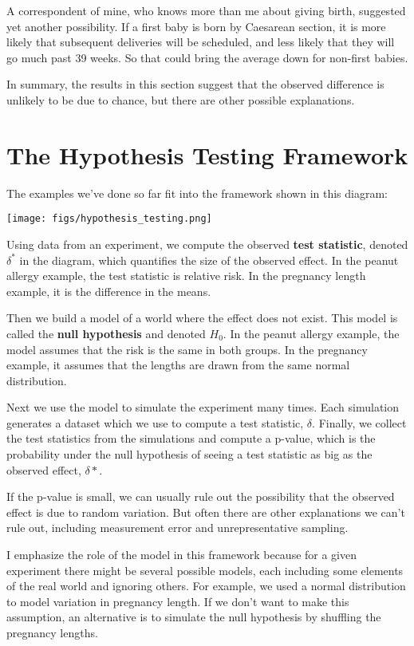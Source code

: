 A correspondent of mine, who knows more than me about giving birth,
suggested yet another possibility. If a first baby is born by Caesarean
section, it is more likely that subsequent deliveries will be scheduled,
and less likely that they will go much past 39 weeks. So that could
bring the average down for non-first babies.

In summary, the results in this section suggest that the observed
difference is unlikely to be due to chance, but there are other possible
explanations.

\section{The Hypothesis Testing
Framework}\label{the-hypothesis-testing-framework}

The examples we've done so far fit into the framework shown in this
diagram:

\texttt{[image: figs/hypothesis\_testing.png]}

Using data from an experiment, we compute the observed \textbf{test
statistic}, denoted \(\delta^*\) in the diagram, which quantifies the
size of the observed effect. In the peanut allergy example, the test
statistic is relative risk. In the pregnancy length example, it is the
difference in the means.

Then we build a model of a world where the effect does not exist. This
model is called the \textbf{null hypothesis} and denoted \(H_0\). In the
peanut allergy example, the model assumes that the risk is the same in
both groups. In the pregnancy example, it assumes that the lengths are
drawn from the same normal distribution.

Next we use the model to simulate the experiment many times. Each
simulation generates a dataset which we use to compute a test statistic,
\(\delta\). Finally, we collect the test statistics from the simulations
and compute a p-value, which is the probability under the null
hypothesis of seeing a test statistic as big as the observed effect,
\(\delta*\).

If the p-value is small, we can usually rule out the possibility that
the observed effect is due to random variation. But often there are
other explanations we can't rule out, including measurement error and
unrepresentative sampling.

I emphasize the role of the model in this framework because for a given
experiment there might be several possible models, each including some
elements of the real world and ignoring others. For example, we used a
normal distribution to model variation in pregnancy length. If we don't
want to make this assumption, an alternative is to simulate the null
hypothesis by shuffling the pregnancy lengths.

